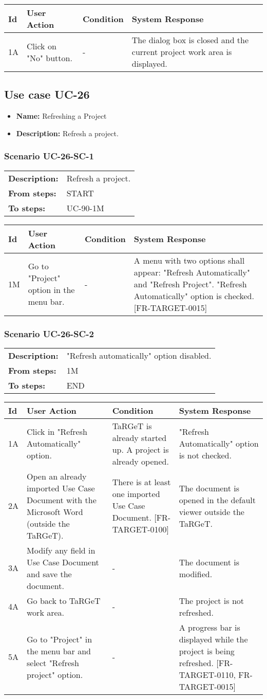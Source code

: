 \documentclass[a4paper,11pt]{article}
\newcommand{\bl}{\\ \hline}
\begin{document}
\begin{tabular}{|p{0.8in}|p{1.6in}|p{1.6in}|p{1.6in}|}
\hline
Id & User Action & Condition & System Response  \bl 
1A & Click on "No" button. & - & The dialog box is closed and the current project work area is displayed. \bl 
\end{tabular}
\subsection*{Use case UC-26}
\begin{itemize}
\item {\bf Name: }Refreshing a Project
\item {\bf Description: }Refresh a project.
\end{itemize}
\subsubsection*{Scenario UC-26-SC-1}
\begin{tabular}{p{1in}p{4in}}
{\bf Description:} & Refresh a project. \\
{\bf From steps:} & START \\
{\bf To steps:} & UC-90-1M \\
\end{tabular}
 
\begin{tabular}{|p{0.8in}|p{1.6in}|p{1.6in}|p{1.6in}|}
\hline
Id & User Action & Condition & System Response  \bl 
1M & Go to "Project" option in the menu bar. & - & A menu with two options shall appear:  "Refresh Automatically" and "Refresh Project". "Refresh Automatically" option is checked. [FR-TARGET-0015] \bl 
\end{tabular}
\subsubsection*{Scenario UC-26-SC-2}
\begin{tabular}{p{1in}p{4in}}
{\bf Description:} & "Refresh automatically" option disabled. \\
{\bf From steps:} & 1M \\
{\bf To steps:} & END \\
\end{tabular}
 
\begin{tabular}{|p{0.8in}|p{1.6in}|p{1.6in}|p{1.6in}|}
\hline
Id & User Action & Condition & System Response  \bl 
1A & Click in "Refresh Automatically" option. & TaRGeT is already started up. A project is already opened. & "Refresh Automatically" option is not checked. \bl 
2A & Open an already imported Use Case Document with the Microsoft Word (outside the TaRGeT). & There is at least one imported Use Case Document. [FR-TARGET-0100] & The document is opened in the default viewer outside the TaRGeT. \bl 
3A & Modify any field in Use Case Document and save the document. & - & The document is modified. \bl 
4A & Go back to TaRGeT work area. & - & The project is not refreshed. \bl 
5A & Go to "Project" in the menu bar and select "Refresh project" option. & - & A progress bar is displayed while the project is being refreshed. [FR-TARGET-0110, FR-TARGET-0015] \bl 
\end{tabular}
\end{document}
